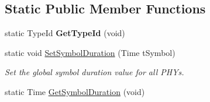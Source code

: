 \subsection*{\-Static \-Public \-Member \-Functions}
\begin{DoxyCompactItemize}
\item 
\hypertarget{classns3_1_1PLC__Phy_af2c0f72bd84e27254b7cabc6ad06e3ed}{static \-Type\-Id {\bfseries \-Get\-Type\-Id} (void)}\label{classns3_1_1PLC__Phy_af2c0f72bd84e27254b7cabc6ad06e3ed}

\item 
static void \hyperlink{classns3_1_1PLC__Phy_a5d5a1f64272f35b2355750e77c0d2868}{\-Set\-Symbol\-Duration} (\-Time t\-Symbol)
\begin{DoxyCompactList}\small\item\em \-Set the global symbol duration value for all \-P\-H\-Ys. \end{DoxyCompactList}\item 
static \-Time \hyperlink{classns3_1_1PLC__Phy_a407d28e0eaa83475f931038c94cd4381}{\-Get\-Symbol\-Duration} (void)
\end{DoxyCompactItemize}
